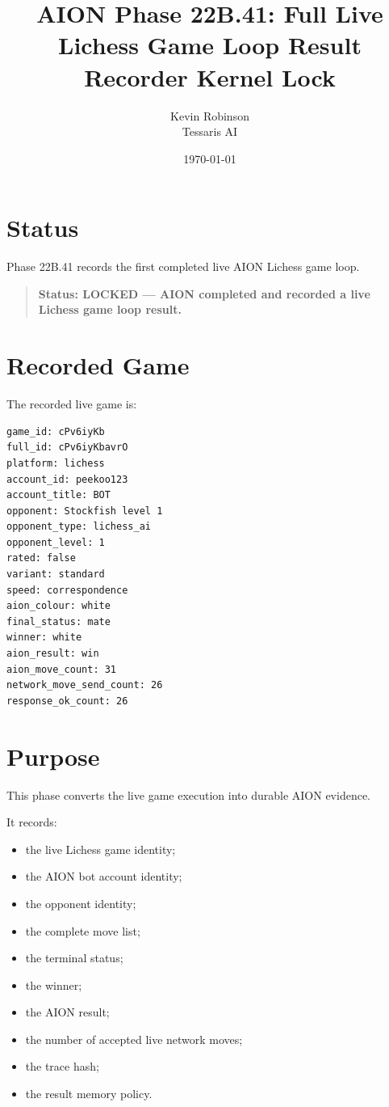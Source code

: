 \documentclass[11pt,a4paper]{article}
\title{\textbf{AION Phase 22B.41: Full Live Lichess Game Loop Result Recorder Kernel Lock}}
\author{Kevin Robinson\\Tessaris AI}
\date{\today}
\begin{document}
\maketitle

\section{Status}

Phase 22B.41 records the first completed live AION Lichess game loop.

\begin{quote}
\textbf{Status: LOCKED --- AION completed and recorded a live Lichess game loop result.}
\end{quote}

\section{Recorded Game}

The recorded live game is:

\begin{verbatim}
game_id: cPv6iyKb
full_id: cPv6iyKbavrO
platform: lichess
account_id: peekoo123
account_title: BOT
opponent: Stockfish level 1
opponent_type: lichess_ai
opponent_level: 1
rated: false
variant: standard
speed: correspondence
aion_colour: white
final_status: mate
winner: white
aion_result: win
aion_move_count: 31
network_move_send_count: 26
response_ok_count: 26
\end{verbatim}

\section{Purpose}

This phase converts the live game execution into durable AION evidence.

It records:

\begin{itemize}
  \item the live Lichess game identity;
  \item the AION bot account identity;
  \item the opponent identity;
  \item the complete move list;
  \item the terminal status;
  \item the winner;
  \item the AION result;
  \item the number of accepted live network moves;
  \item the trace hash;
  \item the result memory policy.
\end{itemize}
\end{document}

